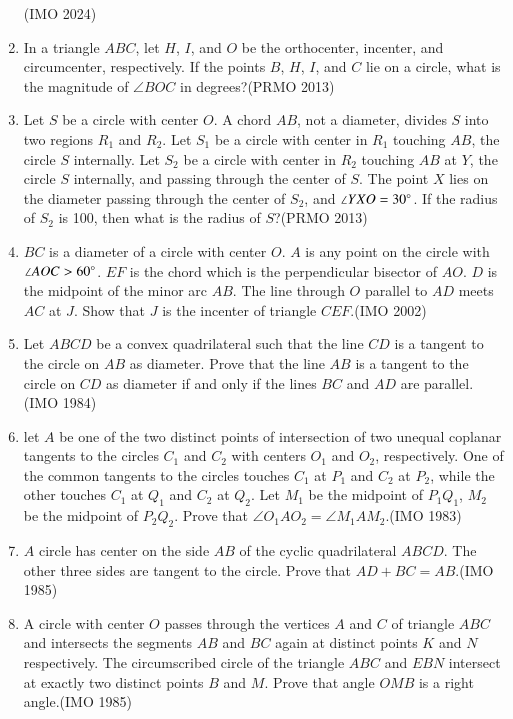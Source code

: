 \begin{enumerate}[label=\thesubsection.\arabic*,ref=\thesubsection.\theenumi]
\hfill(IMO 2024)
\item In a triangle $ ABC $, let $ H $, $ I $, and $ O $ be the orthocenter, incenter, and circumcenter, respectively. If the points $ B $, $ H $, $ I $, and $ C $ lie on a circle, what is the magnitude of $ \angle BOC $ in degrees?\hfill(PRMO 2013)
\item Let $ S $ be a circle with center $ O $. A chord $ AB $, not a diameter, divides $ S $ into two regions $ R_1 $ and $ R_2 $. Let $ S_1 $ be a circle with center in $ R_1 $ touching $ AB $, the circle $ S $ internally. Let $ S_2 $ be a circle with center in $ R_2 $ touching $ AB $ at $ Y $, the circle $ S $ internally, and passing through the center of $ S $. The point $ X $ lies on the diameter passing through the center of $ S_2 $, and $ \angle YXO = 30\degree $. If the radius of $ S_2 $ is 100, then what is the radius of $ S $?\hfill(PRMO 2013)
\item $BC$ is a diameter of a circle with center $O$. $A$ is any point on the circle with $\angle AOC > 60\degree$. $EF$ is the chord which is the perpendicular bisector of $AO$. $D$ is the midpoint of the minor arc $AB$. The line through $O$ parallel to $AD$ meets $AC$ at $J$. Show that $J$ is the incenter of triangle $CEF$.\hfill(IMO 2002)
\item Let $ABCD$ be a convex quadrilateral such that the line $CD$ is a  tangent to the circle on $AB$ as diameter. Prove that the line $AB$ is a tangent to the  circle on $CD$ as diameter if and only if the lines $BC$ and $AD$ are parallel.\hfill(IMO 1984)
\item let $A$ be one of the two distinct points of intersection of two unequal coplanar tangents to the circles $C_1$ and $C_2$ with centers $ O_1$ and $O_2$, respectively. One of the common tangents to the circles touches $C_1$ at $P_1$ and $C_2$ at $P_2$, while the other touches $C_1$ at $Q_1$ and $C_2$ at $Q_2$.  Let $M_1$ be the midpoint of $P_1Q_1$, $M_2$ be the midpoint of $P_2Q_2$. Prove that $\angle O_1AO_2 =\angle M_1AM_2$.\hfill(IMO 1983)
     \item $A$ circle has center on the side $AB$ of the cyclic quadrilateral $ABCD$. The other three sides are tangent to the circle. Prove that $AD+BC = AB$.\hfill(IMO 1985)
\item A circle with center $O$ passes through the vertices $A$ and $C$ of triangle $ABC$ and intersects the segments $AB$ and $BC$ again at distinct points $K$ and $N$ respectively. The circumscribed circle of the triangle $ABC$ and $EBN$ intersect at exactly two distinct points $B$ and $M$. Prove that angle $OMB$ is a right angle.\hfill(IMO 1985)

\end{enumerate}
